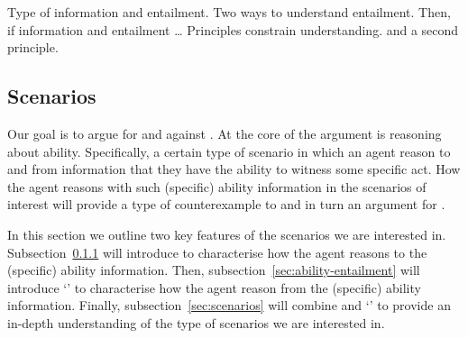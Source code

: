 \begin{note}
  Type of information and entailment.
  Two ways to understand entailment.
  Then, if information and entailment \dots
  Principles constrain understanding.
  \ESU{} and a second principle.
\end{note}

\subsection{Scenarios}
\label{sec:cases-interest}

Our goal is to argue for \EAS{} and against \ESU{}.
At the core of the argument is reasoning about ability.
Specifically, a certain type of scenario in which an agent reason to and from information that they have the ability to witness some specific act.
How the agent reasons with such (specific) ability information in the scenarios of interest will provide a type of counterexample to \ESU{} and in turn an argument for \EAS{}.

In this section we outline two key features of the scenarios we are interested in.
Subsection~\ref{sec:type-scenario} will introduce \gsi{-} to characterise how the agent reasons to the (specific) ability information.
Then, subsection~\ref{sec:ability-entailment} will introduce `' to characterise how the agent reason from the (specific) ability information.
Finally, subsection~\ref{sec:scenarios} will combine \gsi{-} and `' to provide an in-depth understanding of the type of scenarios we are interested in.

\subsubsection{\Gsi{}}
\label{sec:type-scenario}

